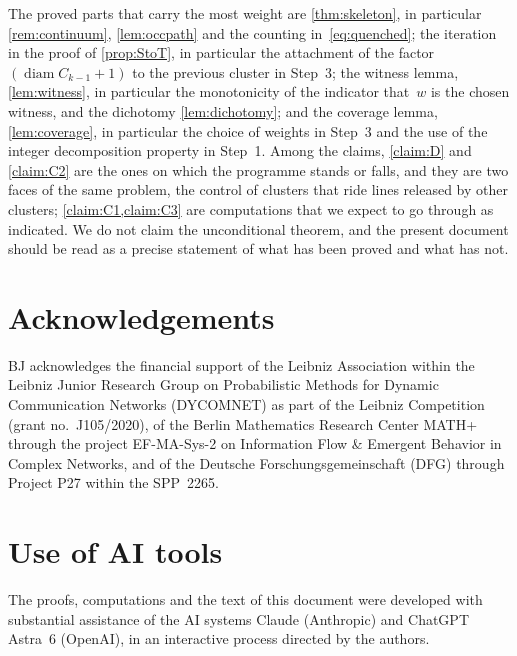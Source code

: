 \documentclass[11pt,letterpaper]{article}
\DeclareMathOperator{\diam}{diam}
\begin{document}
The proved parts that carry the most weight are \cref{thm:skeleton}, in particular \cref{rem:continuum}, \cref{lem:occpath} and the counting in~\eqref{eq:quenched}; the iteration in the proof of \cref{prop:StoT}, in particular the attachment of the factor $(\diam C_{k-1}+1)$ to the previous cluster in Step~3; the witness lemma, \cref{lem:witness}, in particular the monotonicity of the indicator that~$w$ is the chosen witness, and the dichotomy \cref{lem:dichotomy}; and the coverage lemma, \cref{lem:coverage}, in particular the choice of weights in Step~3 and the use of the integer decomposition property in Step~1. Among the claims, \cref{claim:D} and \cref{claim:C2} are the ones on which the programme stands or falls, and they are two faces of the same problem, the control of clusters that ride lines released by other clusters; \cref{claim:C1,claim:C3} are computations that we expect to go through as indicated. We do not claim the unconditional theorem, and the present document should be read as a precise statement of what has been proved and what has not.


\section*{Acknowledgements}

BJ acknowledges the financial support of the Leibniz Association within the Leibniz Junior Research Group on Probabilistic Methods for Dynamic Communication Networks (DYCOMNET) as part of the Leibniz Competition (grant no.~J105/2020), of the Berlin Mathematics Research Center MATH+ through the project EF-MA-Sys-2 on Information Flow \& Emergent Behavior in Complex Networks, and of the Deutsche Forschungsgemeinschaft (DFG) through Project P27 within the SPP~2265.

\section*{Use of AI tools}

The proofs, computations and the text of this document were developed with substantial assistance of the AI systems Claude (Anthropic) and ChatGPT Astra~6 (OpenAI), in an interactive process directed by the authors.



\end{document}
